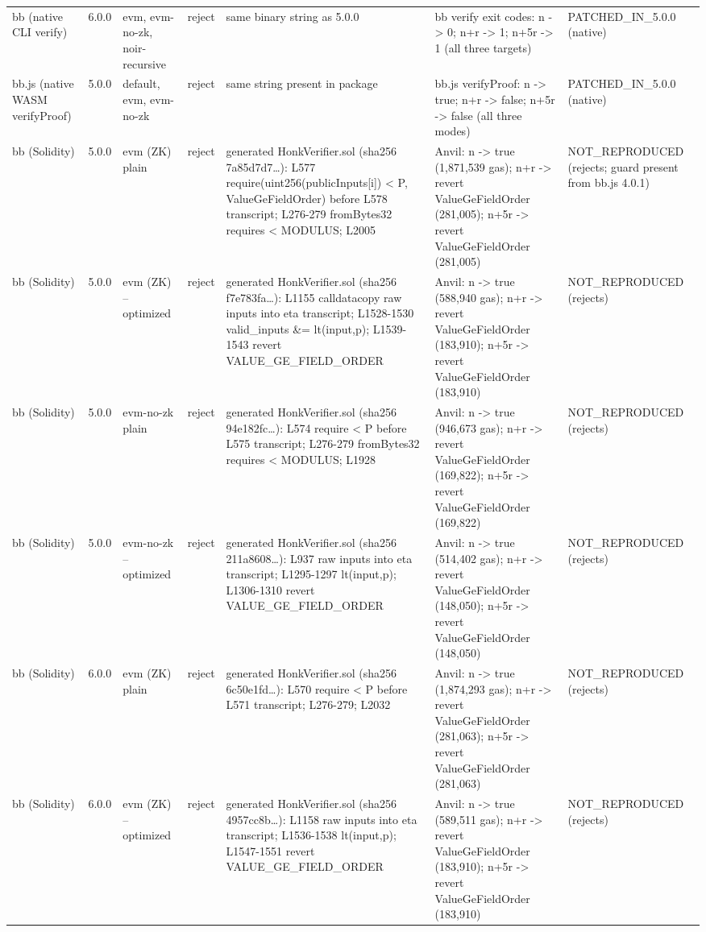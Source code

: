 \begin{tabular}{lllllll}
bb (native CLI verify) & 6.0.0 & evm, evm-no-zk, noir-recursive & reject & same binary string as 5.0.0 & bb verify exit codes: n -> 0; n+r -> 1; n+5r -> 1 (all three targets) & PATCHED\_IN\_5.0.0 (native) \\
bb.js (native WASM verifyProof) & 5.0.0 & default, evm, evm-no-zk & reject & same string present in package & bb.js verifyProof: n -> true; n+r -> false; n+5r -> false (all three modes) & PATCHED\_IN\_5.0.0 (native) \\
bb (Solidity) & 5.0.0 & evm (ZK) plain & reject & generated HonkVerifier.sol (sha256 7a85d7d7…): L577 require(uint256(publicInputs[i]) < P, ValueGeFieldOrder) before L578 transcript; L276-279 fromBytes32 requires < MODULUS; L2005 & Anvil: n -> true (1,871,539 gas); n+r -> revert ValueGeFieldOrder (281,005); n+5r -> revert ValueGeFieldOrder (281,005) & NOT\_REPRODUCED (rejects; guard present from bb.js 4.0.1) \\
bb (Solidity) & 5.0.0 & evm (ZK) --optimized & reject & generated HonkVerifier.sol (sha256 f7e783fa…): L1155 calldatacopy raw inputs into eta transcript; L1528-1530 valid\_inputs \&= lt(input,p); L1539-1543 revert VALUE\_GE\_FIELD\_ORDER & Anvil: n -> true (588,940 gas); n+r -> revert ValueGeFieldOrder (183,910); n+5r -> revert ValueGeFieldOrder (183,910) & NOT\_REPRODUCED (rejects) \\
bb (Solidity) & 5.0.0 & evm-no-zk plain & reject & generated HonkVerifier.sol (sha256 94e182fc…): L574 require < P before L575 transcript; L276-279 fromBytes32 requires < MODULUS; L1928 & Anvil: n -> true (946,673 gas); n+r -> revert ValueGeFieldOrder (169,822); n+5r -> revert ValueGeFieldOrder (169,822) & NOT\_REPRODUCED (rejects) \\
bb (Solidity) & 5.0.0 & evm-no-zk --optimized & reject & generated HonkVerifier.sol (sha256 211a8608…): L937 raw inputs into eta transcript; L1295-1297 lt(input,p); L1306-1310 revert VALUE\_GE\_FIELD\_ORDER & Anvil: n -> true (514,402 gas); n+r -> revert ValueGeFieldOrder (148,050); n+5r -> revert ValueGeFieldOrder (148,050) & NOT\_REPRODUCED (rejects) \\
bb (Solidity) & 6.0.0 & evm (ZK) plain & reject & generated HonkVerifier.sol (sha256 6c50e1fd…): L570 require < P before L571 transcript; L276-279; L2032 & Anvil: n -> true (1,874,293 gas); n+r -> revert ValueGeFieldOrder (281,063); n+5r -> revert ValueGeFieldOrder (281,063) & NOT\_REPRODUCED (rejects) \\
bb (Solidity) & 6.0.0 & evm (ZK) --optimized & reject & generated HonkVerifier.sol (sha256 4957cc8b…): L1158 raw inputs into eta transcript; L1536-1538 lt(input,p); L1547-1551 revert VALUE\_GE\_FIELD\_ORDER & Anvil: n -> true (589,511 gas); n+r -> revert ValueGeFieldOrder (183,910); n+5r -> revert ValueGeFieldOrder (183,910) & NOT\_REPRODUCED (rejects) \\

\end{tabular}
